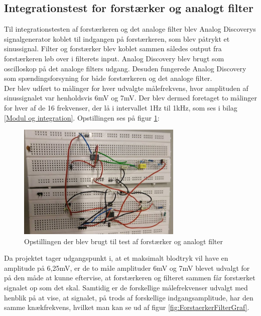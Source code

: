 \subsection{Integrationstest for forstærker og analogt filter}
Til integrationstesten af forstærkeren og det analoge filter blev Analog Discoverys signalgenerator koblet til indgangen på forstærkeren, som blev påtrykt et sinussignal. Filter og forstærker blev koblet sammen således output fra forstærkeren løb over i filterets input. Analog Discovery blev brugt som oscilloskop på det analoge filters udgang. Desuden fungerede Analog Discovery som spændingsforsyning for både forstærkeren og det analoge filter.\\
Der blev udført to målinger for hver udvalgte målefrekvens, hvor amplituden af sinussignalet var henholdsvis 6mV og 7mV. Der blev dermed foretaget to målinger for hver af de 16 frekvenser, der lå i intervallet 1Hz til 1kHz, som ses i bilag \ref{Modul og integration}. Opstillingen ses på figur \ref{fig:ForstaerkerFilterOpstiling}:

\begin{figure}[H]
	\centering
	\includegraphics[width=0.7\textwidth]{Figurer/Hardware/samletopstilling}
	\caption{Opstillingen der blev brugt til test af forstærker og analogt filter}
	\label{fig:ForstaerkerFilterOpstiling}
\end{figure}

Da projektet tager udgangspunkt i, at et maksimalt blodtryk vil have en amplitude på 6,25mV, er de to måle amplituder 6mV og 7mV blevet udvalgt for på den måde at kunne eftervise, at forstærkeren og filteret sammen får forstærket signalet op som det skal. Samtidig er de forskellige målefrekvenser udvalgt med henblik på at vise, at signalet, på trods af forskellige indgangsamplitude, har den samme knækfrekvens, hvilket man kan se ud af figur \ref{fig:ForstaerkerFilterGraf}.

